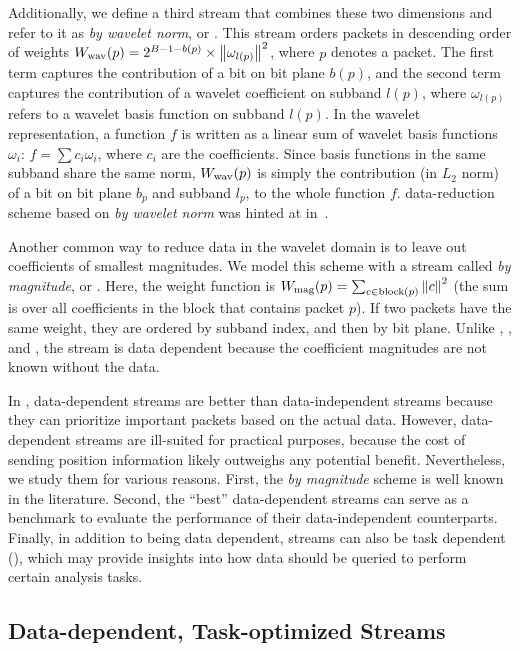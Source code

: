 Additionally, we define a third
stream that combines these two dimensions and refer to it as \emph{by wavelet norm}, or \swav. This
stream orders packets in descending order of weights $\wwav(p)=2^{B-1-b(p)}\times
\norm{\omega_{l(p)}}^2$, where $p$ denotes a packet. The first term captures the contribution of a
bit on bit plane $b(p)$, and the second term captures the contribution of a wavelet coefficient on
subband $l(p)$, where $\omega_{l(p)}$ refers to a wavelet basis function on subband $l(p)$. In the
wavelet representation, a function $f$ is written as a linear sum of wavelet basis functions
$\omega_i$: $f=\sum{c_i\omega_i}$, where $c_i$ are the coefficients. Since basis functions in the
same subband share the same norm, $\wwav(p)$ is simply the contribution (in $L_2$ norm) of a bit on
bit plane $b_p$ and subband $l_p$, to the whole function $f$. 
 data-reduction
scheme based on \emph{by wavelet norm} was hinted at in~\cite{weiss}.

Another common way to reduce data in the wavelet domain is to leave out coefficients of smallest
magnitudes. We model this scheme with a stream called \emph{by magnitude}, or \smag. Here, the
weight function is $\wmag(p)=\sum_{c\in \text{block}(p)}\norm{c}^2$ (the sum is over all
coefficients in the block that contains packet $p$). If two packets have the same weight, they are
ordered by subband index, and then by bit plane. Unlike \slvl, \sbit, and \swav, the \smag stream is
data dependent because the coefficient magnitudes are not known without the data.

In , data-dependent streams are better than data-independent streams because they can
prioritize important packets based on the actual data. However, data-dependent streams are
ill-suited for practical purposes, because the cost of sending position information likely outweighs
any potential benefit. Nevertheless, we study them for various reasons. First, the \emph{by
magnitude} scheme is well known in the literature. Second, the ``best'' data-dependent streams can
serve as a benchmark to evaluate the performance of their data-independent counterparts. Finally, in
addition to being data dependent, streams can also be task dependent (),
which may provide insights into how data should be queried to perform certain analysis tasks.

\subsection{Data-dependent, Task-optimized Streams} \label{sec:data_dep_streams}

